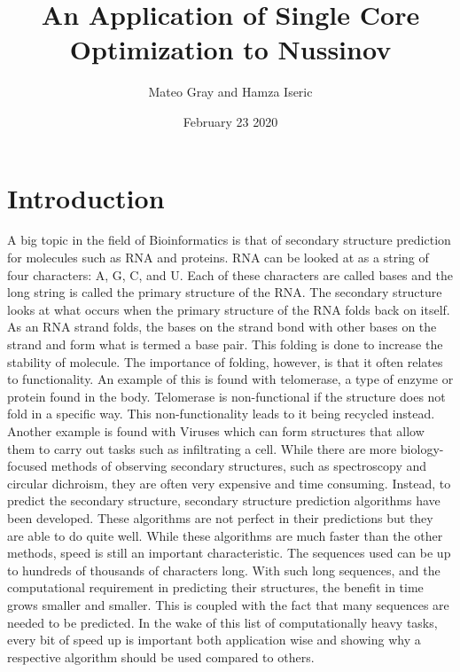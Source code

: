 \documentclass{article}
\title{An Application of Single Core Optimization to Nussinov }
\author{Mateo Gray and Hamza Iseric }
\date{February 23 2020}
\begin{document}
\maketitle\nocite{*}

\section{Introduction}

A big topic in the field of Bioinformatics is that of secondary structure prediction for molecules such as RNA and proteins. RNA can be looked at as a string of four characters: A, G, C, and U. Each of these characters are called bases and the long string is called the primary structure of the RNA. The secondary structure looks at what occurs when the primary structure of the RNA folds back on itself. As an RNA strand folds, the bases on the strand bond with other bases on the strand and form what is termed a base pair. This folding is done to increase the stability of molecule. The importance of folding, however, is that it often relates to functionality. An example of this is found with telomerase, a type of enzyme or protein found in the body. Telomerase is non-functional if the structure does not fold in a specific way. This non-functionality leads to it being recycled instead. Another example is found with Viruses which can form structures that allow them to carry out tasks such as infiltrating a cell. While there are more biology-focused methods of observing secondary structures, such as spectroscopy and circular dichroism, they are often very expensive and time consuming. Instead, to predict the secondary structure, secondary structure prediction algorithms have been developed. These algorithms are not perfect in their predictions but they are able to do quite well. While these algorithms are much faster than the other methods, speed is still an important characteristic. The sequences used can be up to hundreds of thousands of characters long. With such long sequences, and the computational requirement in predicting their structures, the benefit in time grows smaller and smaller. This is coupled with the fact that many sequences are needed to be predicted. In the wake of this list of computationally heavy tasks, every bit of speed up is important both application wise and showing why a respective algorithm should be used compared to others.
\end{document}
